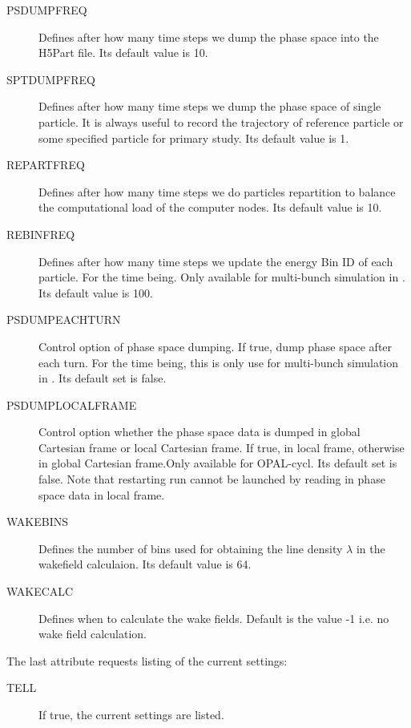 \begin{description}
\item[PSDUMPFREQ]
   Defines after how many time steps we dump the phase space into the H5Part file. Its default value is 10.   
\item[SPTDUMPFREQ]
   Defines after how many time steps we dump the phase space of single particle.
   It is always useful to record the trajectory of reference particle
   or some specified particle for primary study. Its default value is 1.  
\item[REPARTFREQ]
   Defines after how many time steps we do particles repartition to balance the computational load of  
   the computer nodes. Its default value is 10.  
   
\item[REBINFREQ]
   Defines after how many time steps we update the energy Bin ID of each particle. For the time being. 
   Only available for multi-bunch simulation in \opalcycl. Its default value is 100.  

\item[PSDUMPEACHTURN]
 Control option of phase space dumping. If true, dump phase space after each turn. 
 For the time being, this is only use for multi-bunch simulation in \opalcycl. Its default set is false. 

\item[PSDUMPLOCALFRAME]
 Control option whether the phase space data is dumped in global Cartesian frame or local Cartesian frame.
 If true, in local frame, otherwise in global Cartesian frame.Only available for OPAL-cycl. Its default set is false.
 Note that restarting run cannot be launched by reading in phase space data in local frame.
     
 \item[WAKEBINS]
   Defines the number of bins used for obtaining the line density $\lambda$ in the wakefield calculaion.
Its default value is 64. 

\item[WAKECALC]
   Defines when to calculate the wake fields.  Default is the value -1 i.e. no wake field calculation. 
\end{description}
The last attribute requests listing of the current settings:
\begin{description}
\item[TELL]
  If true, the current settings are listed.
\end{description}

